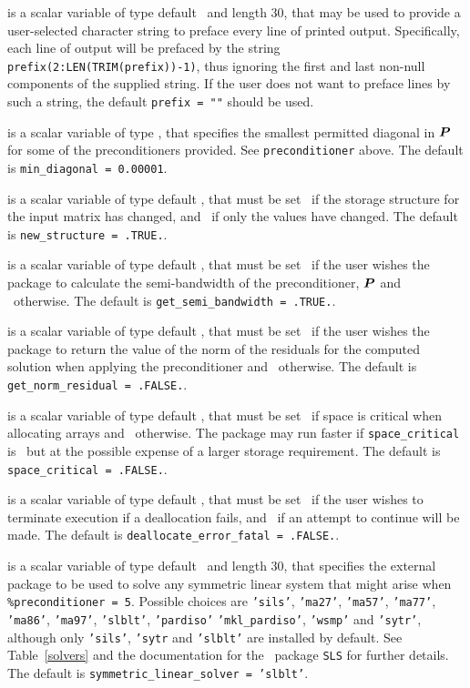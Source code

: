 \documentclass{galahad}
\begin{document}
\begin{description}
 is a scalar variable of type default \character\
and length 30, that may be used to provide a user-selected
character string to preface every line of printed output.
Specifically, each line of output will be prefaced by the string
{\tt prefix(2:LEN(TRIM(prefix))-1)},
thus ignoring the first and last non-null components of the
supplied string. If the user does not want to preface lines by such
a string, the default {\tt prefix = ""} should be used.

 is a scalar variable of type \realdp,
that specifies the smallest permitted diagonal in ${\bm{P}}$ for some
of the preconditioners provided. See {\tt preconditioner} above.
The default is {\tt min\_diagonal = 0.00001}.

 is a scalar variable of type default \logical,
that must be set \true\ if the storage structure for the input matrix has
changed, and \false\ if only the values have changed.
The default is {\tt new\_structure = .TRUE.}.

 is a scalar variable of type default \logical,
that must be set \true\ if the user wishes the package to calculate
the semi-bandwidth of the preconditioner, ${\bm{P}}$
and  \false\ otherwise.
The default is {\tt get\_semi\_bandwidth = .TRUE.}.

 is a scalar variable of type default \logical,
that must be set \true\ if the user wishes the package to return
the value of the norm of the residuals for the computed solution
when applying the preconditioner and  \false\ otherwise.
The default is {\tt get\_norm\_residual = .FALSE.}.

 is a scalar variable of type default \logical,
that must be set \true\ if space is critical when allocating arrays
and  \false\ otherwise. The package may run faster if
{\tt space\_critical} is \false\ but at the possible expense of a larger
storage requirement. The default is {\tt space\_critical = .FALSE.}.

 is a scalar variable of type default \logical,
that must be set \true\ if the user wishes to terminate execution if
a deallocation  fails, and \false\ if an attempt to continue
will be made. The default is {\tt deallocate\_error\_fatal = .FALSE.}.

 is a scalar variable of type default \character\
and length 30, that specifies the external package to be used to
solve any symmetric linear system that might arise
when {\tt \%precondit\-ioner = 5}. Possible choices are
{\tt 'sils'},
{\tt 'ma27'},
{\tt 'ma57'},
{\tt 'ma77'},
{\tt 'ma86'},
{\tt 'ma97'},
{\tt 'slblt'},
{\tt 'pardiso'}
{\tt 'mkl\_pardiso'},
{\tt 'wsmp'} and
{\tt 'sytr'},
although only {\tt 'sils'}, {\tt 'sytr} and {\tt 'slblt'} are installed by default.
See Table~\ref{solvers} and
the documentation for the \galahad\ package {\tt SLS} for further details.
The default is {\tt symmetric\_linear\_solver = 'slblt'}.


\end{description}
\end{document}
